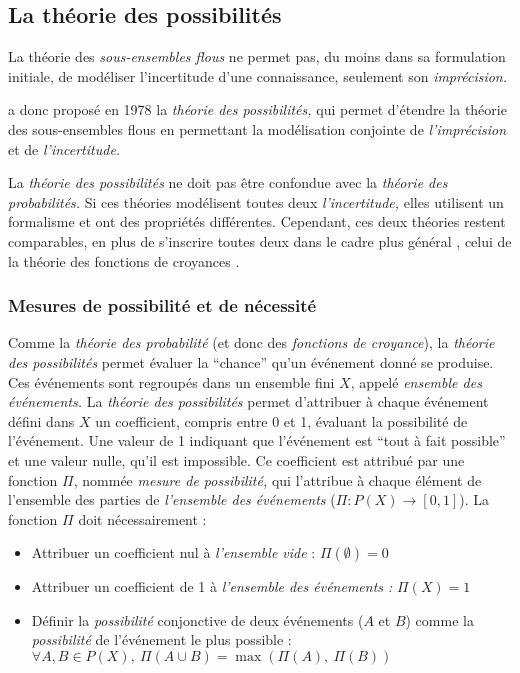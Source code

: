 

\subsection{La théorie des possibilités}


La théorie des \emph{sous-ensembles flous} ne permet pas, du moins
dans sa formulation initiale, de modéliser l'incertitude d'une
connaissance, seulement son \emph{imprécision.}

\textcite{Zadeh1978} a donc proposé en 1978 la \emph{théorie des
  possibilités,} qui permet d'étendre la théorie des sous-ensembles
flous en permettant la modélisation conjointe de \emph{l'imprécision}
et de \emph{l'incertitude.}

La \emph{théorie des possibilités} ne doit pas être confondue avec la
\emph{théorie des probabilités.} Si ces théories modélisent toutes
deux \emph{l'incertitude,} elles utilisent un formalisme et ont des
propriétés différentes. Cependant, ces deux théories restent
comparables, en plus de s’inscrire toutes deux dans le cadre plus
général \autocite{Bouchon-Meunier1995}, celui de la théorie des
fonctions de croyances \autocite{Shafer1976}.

\subsubsection{Mesures de possibilité et de nécessité}

Comme la \emph{théorie des probabilité} (et donc des \emph{fonctions
  de croyance}), la \emph{théorie des possibilités} permet évaluer la
\enquote{chance} qu'un événement donné se produise. Ces événements
sont regroupés dans un ensemble fini \(X\), appelé \emph{ensemble des
  événements.} La \emph{théorie des possibilités} permet d'attribuer à
chaque événement défini dans \(X\) un coefficient, compris entre 0 et
1, évaluant la possibilité de l'événement. Une valeur de 1 indiquant
que l'événement est \enquote{tout à fait possible}
\autocite[p. 43]{Bouchon-Meunier2007} et une valeur nulle, qu'il est
impossible. Ce coefficient est attribué par une fonction \(Π\), nommée
\emph{mesure de possibilité,} qui l'attribue à chaque élément de
l'ensemble des parties de \emph{l'ensemble des événements}
(\(Π : P(X) → [0,1]\)). La fonction \(Π\) doit nécessairement :

\begin{itemize}
\item Attribuer un coefficient nul à \emph{l'ensemble vide} :
  \(Π(∅)=0\)
\item Attribuer un coefficient de 1 à \emph{l'ensemble des événements
    :} \(Π(X)=1\)
\item Définir la \emph{possibilité} conjonctive de deux événements
  (\(A\) et \(B\)) comme la \emph{possibilité} de l'événement le plus
  possible : \(∀ A,B ∈ P(X),\ Π(A ∪ B) = \max(Π(A),\ Π(B))\)
\end{itemize}

